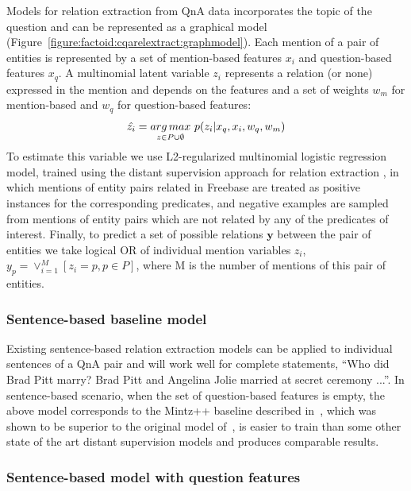 Models for relation extraction from QnA data incorporates the topic of the question and can be represented as a graphical model (Figure~\ref{figure:factoid:cqarelextract:graphmodel}).
Each mention of a pair of entities is represented by a set of mention-based features $x_i$ and question-based features $x_q$.
A multinomial latent variable $z_i$ represents a relation (or none) expressed in the mention and depends on the features and a set of weights $w_m$ for mention-based and $w_q$ for question-based features:
$$\hat{z_i}=\underset{z \in P \cup \emptyset}{arg\,max}\,\, p(z_i|x_q, x_i, w_q, w_m)$$
To estimate this variable we use L2-regularized multinomial logistic regression model, trained using the distant supervision approach for relation extraction \cite{MintzBSJ09}, in which mentions of entity pairs related in Freebase are treated as positive instances for the corresponding predicates, and negative examples are sampled from mentions of entity pairs which are not related by any of the predicates of interest.
Finally, to predict a set of possible relations $\mathbf{y}$ between the pair of entities we take logical OR of individual mention variables $z_i$, \ie $y_p = \lor_{i=1}^M [z_i = p, p \in P]$, where M is the number of mentions of this pair of entities.

\subsubsection{Sentence-based baseline model}
\label{section:factoid:cqarelextract:models:baseline}

Existing sentence-based relation extraction models can be applied to individual sentences of a QnA pair and will work well for complete statements, \eg ``Who did Brad Pitt marry? Brad Pitt and Angelina Jolie married at secret ceremony ...''.
In sentence-based scenario, when the set of question-based features is empty, the above model corresponds to the Mintz++ baseline described in~\cite{Surdeanu:2012:MML:2390948.2391003}, which was shown to be superior to the original model of~\cite{MintzBSJ09}, is easier to train than some other state of the art distant supervision models and produces comparable results.

\subsubsection{Sentence-based model with question features}
\label{section:factoid:cqarelextract:models:baselineqfeat}


